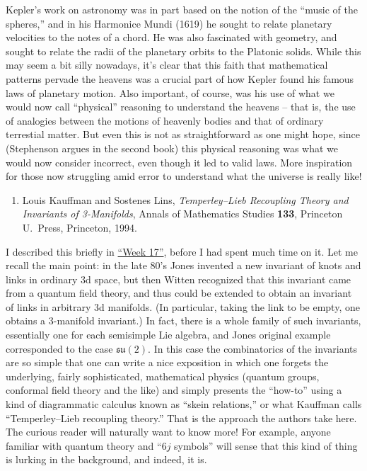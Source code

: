 \documentclass{article}
\def\tightlist{}
\begin{document}
Kepler's work on astronomy was in part based on the notion of the
``music of the spheres,'' and in his Harmonice Mundi (1619) he sought to
relate planetary velocities to the notes of a chord. He was also
fascinated with geometry, and sought to relate the radii of the
planetary orbits to the Platonic solids. While this may seem a bit silly
nowadays, it's clear that this faith that mathematical patterns pervade
the heavens was a crucial part of how Kepler found his famous laws of
planetary motion. Also important, of course, was his use of what we
would now call ``physical'' reasoning to understand the heavens -- that
is, the use of analogies between the motions of heavenly bodies and that
of ordinary terrestial matter. But even this is not as straightforward
as one might hope, since (Stephenson argues in the second book) this
physical reasoning was what we would now consider incorrect, even though
it led to valid laws. More inspiration for those now struggling amid
error to understand what the universe is really like!

\begin{enumerate}
\def\labelenumi{\arabic{enumi})}
\setcounter{enumi}{2}
\tightlist
\item
  Louis Kauffman and Sostenes Lins, 
  \emph{Temperley--Lieb Recoupling Theory and Invariants of 3-Manifolds},
  Annals of Mathematics Studies
  \textbf{133}, Princeton U.\ Press, Princeton, 1994.
\end{enumerate}

I described this briefly in \protect\hyperlink{week17}{``Week 17''},
before I had spent much time on it. Let me recall the main point: in the
late 80's Jones invented a new invariant of knots and links in ordinary
3d space, but then Witten recognized that this invariant came from a
quantum field theory, and thus could be extended to obtain an invariant
of links in arbitrary 3d manifolds. (In particular, taking the link to
be empty, one obtains a 3-manifold invariant.) In fact, there is a whole
family of such invariants, essentially one for each semisimple Lie
algebra, and Jones original example corresponded to the case
\(\mathfrak{su}(2)\). In this case the combinatorics of the invariants
are so simple that one can write a nice exposition in which one forgets
the underlying, fairly sophisticated, mathematical physics (quantum
groups, conformal field theory and the like) and simply presents the
``how-to'' using a kind of diagrammatic calculus known as ``skein
relations,'' or what Kauffman calls ``Temperley--Lieb recoupling
theory.'' That is the approach the authors take here. The curious reader
will naturally want to know more! For example, anyone familiar with
quantum theory and ``\(6j\) symbols'' will sense that this kind of thing
is lurking in the background, and indeed, it is.
\end{document}
